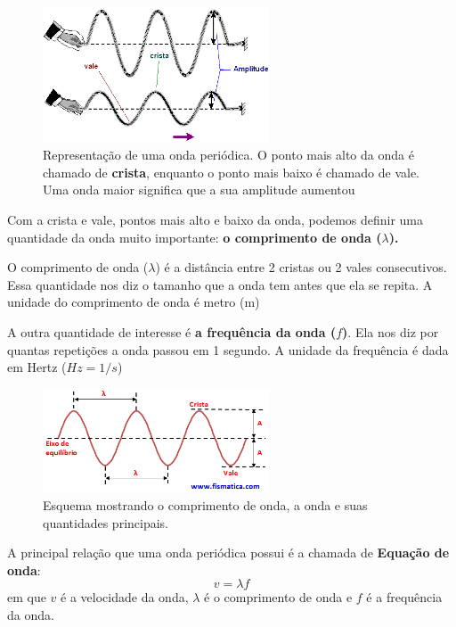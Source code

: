 \documentclass[12pt]{extarticle}
\newcommand{\<}{\langle}
\renewcommand{\>}{\rangle}
\theoremstyle{definition}
\begin{document}
\begin{figure}[H]
    \centering
    \includegraphics[width=0.6\textwidth]{periodicas.png}
    \caption{Representação de uma onda periódica. O ponto mais alto da onda é chamado de \textbf{crista}, enquanto o ponto mais baixo é chamado de vale. Uma onda maior significa que a sua amplitude aumentou}
    \label{fig:periodica}
\end{figure}
Com a crista e vale, pontos mais alto e baixo da onda, podemos definir uma quantidade da onda muito importante: \textbf{o comprimento de onda ($\lambda$).}

O comprimento de onda ($\lambda$) é a distância entre 2 cristas ou 2 vales consecutivos. Essa quantidade nos diz o tamanho que a onda tem antes que ela se repita. A unidade do comprimento de onda é metro (m)

A outra quantidade de interesse é \textbf{a frequência da onda ($f$)}. Ela nos diz por quantas repetições a onda passou em 1 segundo. A unidade da frequência é dada em Hertz ($Hz = 1/s$)

\begin{figure}[H]
    \centering
    \includegraphics[width=0.6\textwidth]{lambda.png}
    \caption{Esquema mostrando o comprimento de onda, a onda e suas quantidades principais.}
    \label{fig:lambda}
\end{figure}

A principal relação que uma onda periódica possui é a chamada de \textbf{Equação de onda}:
\begin{equation}
    v=\lambda f
\end{equation}
\noindent em que $v$ é a velocidade da onda, $\lambda$ é o comprimento de onda e $f$ é a frequência da onda.
\end{document}
